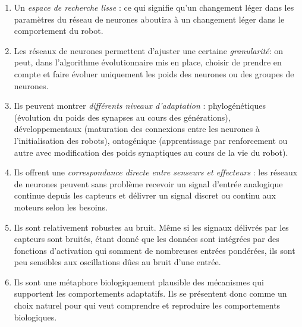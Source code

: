 \begin{enumerate}

   \item Un \emph{espace de recherche lisse} : ce qui signifie qu'un changement léger dans les paramètres du réseau de neurones aboutira à un changement léger dans le comportement du robot.%

   \item Les réseaux de neurones permettent d'ajuster une certaine \emph{granularité}: on peut, dans l'algorithme évolutionnaire mis en place, choisir de prendre en compte et faire évoluer uniquement les poids des neurones ou des groupes de neurones.

   \item Ils peuvent montrer \emph{différents niveaux d'adaptation} : phylogénétiques (évolution du poids des synapses au cours des générations), développementaux (maturation des connexions entre les neurones à l'initialisation des robots), ontogénique (apprentissage par renforcement ou autre avec modification des poids synaptiques au cours de la vie du robot).

   \item Ils offrent une \emph{correspondance directe entre senseurs et effecteurs} : les réseaux de neurones peuvent sans problème recevoir un signal d'entrée analogique continue depuis les capteurs et délivrer un signal discret ou continu aux moteurs selon les besoins.

   \item Ils sont relativement robustes au bruit. Même si les signaux délivrés par les capteurs sont bruités, étant donné que les données sont intégrées par des fonctions d'activation qui somment de nombreuses entrées pondérées, ils sont peu sensibles aux oscillations dûes au bruit d'une entrée.

   \item Ils sont une métaphore biologiquement plausible des mécanismes qui supportent les comportements adaptatifs. Ils se présentent donc comme un choix naturel pour qui veut comprendre et reproduire les comportements biologiques. \\

       \citep[Plus ou moins librement adaptées de ][p. 39 les emphases ont toutes été ajoutées]{nolfi00evolrobobiolintetechselfmach}

\end{enumerate}

